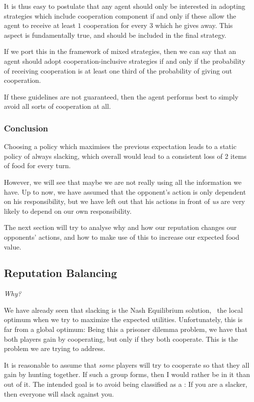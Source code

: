 \documentclass[10pt,fleqn]{article}
\begin{document}
It is thus easy to postulate that any agent should only be interested in
adopting strategies which include cooperation component if and only if these
allow the agent to receive at least $1$ cooperation for every $3$ which he gives
away. This aspect is fundamentally true, and should be included in the final
strategy.

If we port this in the framework of mixed strategies, then we can say that an
agent should adopt cooperation-inclusive strategies if and only if the
probability of receiving cooperation is at least one third of the probability of
giving out cooperation.

If these guidelines are not guaranteed, then the agent performs best to simply
avoid all sorts of cooperation at all.


\subsubsection{Conclusion}
Choosing a policy which maximises the previous expectation leads to a static
policy of always slacking, which overall would lead to a consistent loss of 2
items of food for every turn.

However, we will see that maybe we are not really using all the information we
have. Up to now, we have assumed that the opponent's action is only dependent on
his responsibility, but we have left out that his actions in front of \emph{us}
are very likely to depend on our own responsibility.

The next section will try to analyse why and how our reputation changes our
opponents' actions, and how to make use of this to increase our expected food
value.

\subsection{Reputation Balancing}
\emph{Why?}

We have already seen that slacking is the Nash Equilibrium solution, \ie\ the
local optimum when we try to maximize the expected utilities. Unfortunately,
this is far from a global optimum: Being this a prisoner dilemma problem, we
have that both players gain by cooperating, but only if they both cooperate.
This is the problem we are trying to address.

It is reasonable to assume that \emph{some} players will try to cooperate so
that they all gain by hunting together. If such a group forms, then I would
rather be in it than out of it. The intended goal is to avoid being classified
as a : If you are a slacker, then everyone will slack against you.
\end{document}

